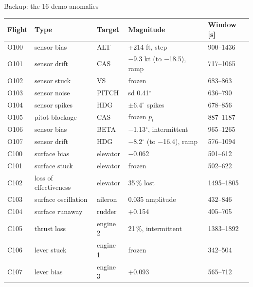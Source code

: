 \documentclass[aspectratio=169,11pt]{beamer}
\begin{document}
\begin{frame}{Backup: the 16 demo anomalies}
  \scriptsize
  \begin{tabularx}{\textwidth}{@{}l l l L l@{}}
    \toprule
    Flight & Type & Target & Magnitude & Window [s] \\
    \midrule
    O100 & sensor bias & ALT & +214 ft, step & 900--1436 \\
    O101 & sensor drift & CAS & $-$9.3 kt (to $-$18.5), ramp & 717--1065 \\
    O102 & sensor stuck & VS & frozen & 683--863 \\
    O103 & sensor noise & PITCH & sd 0.41$^\circ$ & 636--790 \\
    O104 & sensor spikes & HDG & $\pm$6.4$^\circ$ spikes & 678--856 \\
    O105 & pitot blockage & CAS & frozen $p_t$ & 887--1187 \\
    O106 & sensor bias & BETA & $-$1.13$^\circ$, intermittent & 965--1265 \\
    O107 & sensor drift & HDG & $-$8.2$^\circ$ (to $-$16.4), ramp & 576--1094 \\
    C100 & surface bias & elevator & $-$0.062 & 501--612 \\
    C101 & surface stuck & elevator & frozen & 502--622 \\
    C102 & loss of effectiveness & elevator & 35\,\% lost & 1495--1805 \\
    C103 & surface oscillation & aileron & 0.035 amplitude & 432--846 \\
    C104 & surface runaway & rudder & +0.154 & 405--705 \\
    C105 & thrust loss & engine 2 & 21\,\%, intermittent & 1383--1892 \\
    C106 & lever stuck & engine 1 & frozen & 342--504 \\
    C107 & lever bias & engine 3 & +0.093 & 565--712 \\
    \bottomrule
  \end{tabularx}
\end{frame}
\end{document}
